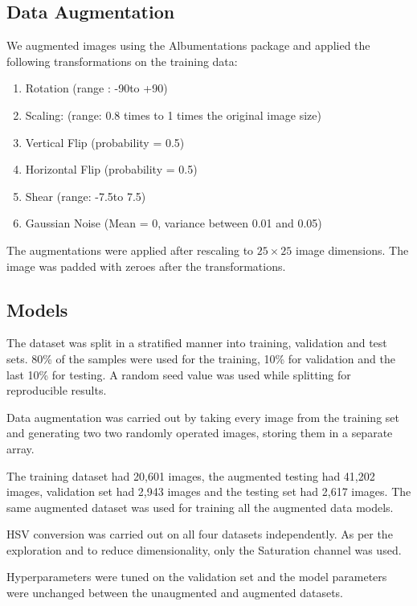 \documentclass[10pt,twocolumn,letterpaper]{article}
\begin{document}
\subsection{Data Augmentation}

We augmented images using the Albumentations package \cite{info11020125} and applied the following transformations on the training data:
\begin{enumerate}
   \item Rotation (range : -90\textdegree to +90\textdegree)
   \item Scaling: (range: 0.8 times to 1 times the original image size)
   \item Vertical Flip (probability = 0.5)
   \item Horizontal Flip (probability = 0.5)
   \item Shear (range: -7.5\textdegree to 7.5\textdegree)
   \item Gaussian Noise (Mean = 0, variance between 0.01 and 0.05)
\end{enumerate}

The augmentations were applied after rescaling to $25 \times 25$ image dimensions. The image was padded with zeroes after the transformations.

\subsection{Models}
The dataset was split in a stratified manner into training, validation and test sets. 80\% of the samples were used for the training, 10\% for validation and the last 10\% for testing. A random seed value was used while splitting for reproducible results.

Data augmentation was carried out by taking every image from the training set and generating two two randomly operated images, storing them in a separate array. 

The training dataset had 20,601 images, the augmented testing had 41,202 images, validation set had 2,943 images and the testing set had 2,617 images. The same augmented dataset was used for training all the augmented data models.

HSV conversion was carried out on all four datasets independently. As per the exploration and to reduce dimensionality, only the Saturation channel was used.

Hyperparameters were tuned on the validation set and the model parameters were unchanged between the unaugmented and augmented datasets.
\end{document}
